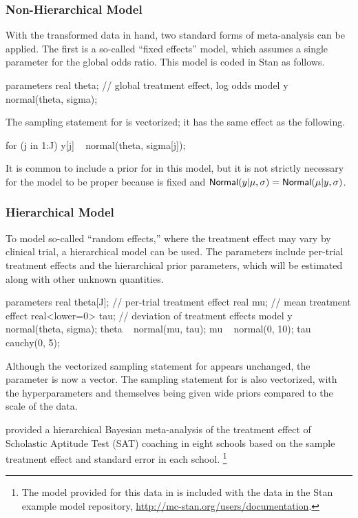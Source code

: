 \subsubsection{Non-Hierarchical Model}

With the transformed data in hand, two standard forms of meta-analysis
can be applied.  The first is a so-called ``fixed effects'' model,
which assumes a single parameter for the global odds ratio.  This
model is coded in Stan as follows.
%
\begin{stancode}
parameters {
  real theta;  // global treatment effect, log odds
}
model {
  y ~ normal(theta, sigma);
}
\end{stancode}
%
The sampling statement for  is vectorized; it has the same
effect as the following.
\begin{stancode}
  for (j in 1:J)
    y[j] ~ normal(theta, sigma[j]);
\end{stancode}
%
It is common to include a prior for  in this model, but it
is not strictly necessary for the model to be proper because 
is fixed and $\mbox{\sf Normal}(y|\mu,\sigma) =
\mbox{\sf Normal}(\mu|y,\sigma)$.

\subsubsection{Hierarchical Model}

To model so-called ``random effects,'' where the treatment effect may
vary by clinical trial, a hierarchical model can be used.  The
parameters include per-trial treatment effects and the hierarchical
prior parameters, which will be estimated along with other unknown
quantities.
%
\begin{stancode}
parameters {
  real theta[J];      // per-trial treatment effect
  real mu;            // mean treatment effect
  real<lower=0> tau;  // deviation of treatment effects
}
model {
  y ~ normal(theta, sigma);
  theta ~ normal(mu, tau);
  mu ~ normal(0, 10);
  tau ~ cauchy(0, 5);
}
\end{stancode}
%
Although the vectorized sampling statement for  appears
unchanged, the parameter  is now a vector.  The sampling
statement for  is also vectorized, with the
hyperparameters  and  themselves being given wide
priors compared to the scale of the data.

\citet{Rubin:1981} provided a hierarchical Bayesian meta-analysis of
the treatment effect of Scholastic Aptitude Test (SAT) coaching in
eight schools based on the sample treatment effect and standard error
in each school.%
%
\footnote{The model provided for this data in
\citep[Section~5.5]{GelmanEtAl:2013} is included with the
data in the Stan example model repository,
\url{http://mc-stan.org/users/documentation}.}

